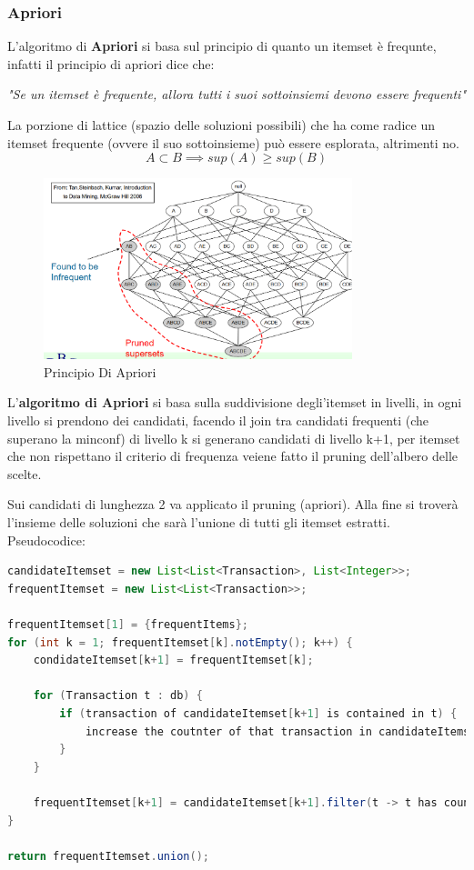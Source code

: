 \documentclass[12pt]{article}
\begin{document}
\subsubsection{Apriori}
L'algoritmo di \textbf{Apriori} si basa sul principio di quanto un itemset \`e frequnte, infatti il principio di apriori dice che:

\emph{"Se un itemset \`e frequente, allora tutti i suoi sottoinsiemi devono essere frequenti"}

La porzione di lattice (spazio delle soluzioni possibili) che ha come radice un itemset frequente (ovvere il suo sottoinsieme) pu\`o essere esplorata, altrimenti no.
\[ A \subset B \implies sup(A) \geqslant  sup(B) \]
\begin{figure}[H]
    \centering
    \includegraphics[width=0.8\textwidth]{principio-di-apriori.png}
    \caption{Principio Di Apriori}
    \label{fig:principio-di-apriori}
\end{figure}
L'\textbf{algoritmo di Apriori} si basa sulla suddivisione degli'itemset in  livelli, in ogni livello si prendono dei candidati, facendo il join tra candidati frequenti (che superano la minconf) di livello k si generano candidati di livello k+1, per itemset che non rispettano il criterio di frequenza veiene fatto il pruning dell'albero delle scelte.

Sui candidati di lunghezza 2 va applicato il pruning (apriori). Alla fine si trover\`a l'insieme delle soluzioni che sar\`a l'unione di tutti gli itemset estratti. Pseudocodice:
\begin{lstlisting}[language=java]
candidateItemset = new List<List<Transaction>, List<Integer>>;
frequentItemset = new List<List<Transaction>>;

frequentItemset[1] = {frequentItems};
for (int k = 1; frequentItemset[k].notEmpty(); k++) {
    condidateItemset[k+1] = frequentItemset[k];

    for (Transaction t : db) {
        if (transaction of candidateItemset[k+1] is contained in t) {
            increase the coutnter of that transaction in candidateItemset[k+1];
        }
    }

    frequentItemset[k+1] = candidateItemset[k+1].filter(t -> t has count greater than minsup);
}

return frequentItemset.union();
\end{lstlisting}
\end{document}
